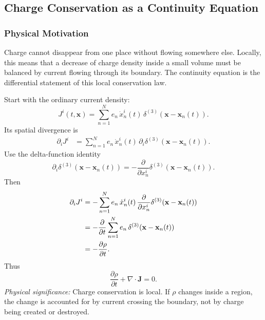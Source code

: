 \subsection{Charge Conservation as a Continuity Equation}\label{subsec:lec09-continuity}

\subsubsection*{Physical Motivation}
Charge cannot disappear from one place without flowing somewhere else.  Locally,
this means that a decrease of charge density inside a small volume must be
balanced by current flowing through its boundary.  The continuity equation is
the differential statement of this local conservation law.

Start with the ordinary current density:
\begin{equation}\label{eq:lec09-Ji-start}
  J^i(t,\mathbf{x})
  =
  \sum_{n=1}^N e_n\,\dot{x}_n^i(t)\,
  \delta^{(3)}\!\left(\mathbf{x}-\mathbf{x}_n(t)\right).
\end{equation}
Its spatial divergence is
\begin{align}
  \partial_i J^i
  &=
  \sum_{n=1}^N e_n\,\dot{x}_n^i(t)\,
  \partial_i
  \delta^{(3)}\!\left(\mathbf{x}-\mathbf{x}_n(t)\right).
  \label{eq:lec09-divJ-first}
\end{align}
Use the delta-function identity
\begin{equation}\label{eq:lec09-delta-identity}
  \partial_i
  \delta^{(3)}\!\left(\mathbf{x}-\mathbf{x}_n(t)\right)
  =
  -\frac{\partial}{\partial x_n^i}
  \delta^{(3)}\!\left(\mathbf{x}-\mathbf{x}_n(t)\right).
\end{equation}
Then
\begin{align}
  \partial_i J^i
  &=
  -\sum_{n=1}^N e_n\,\dot{x}_n^i(t)\,
  \frac{\partial}{\partial x_n^i}
  \delta^{(3)}\!\left(\mathbf{x}-\mathbf{x}_n(t)\right) \notag\\
  &=
  -\frac{\partial}{\partial t}
  \sum_{n=1}^N e_n\,
  \delta^{(3)}\!\left(\mathbf{x}-\mathbf{x}_n(t)\right) \notag\\
  &=
  -\frac{\partial \rho}{\partial t}.
  \label{eq:lec09-divJ-final}
\end{align}
Thus
\begin{equation}\label{eq:lec09-continuity-3d}
  \boxed{
  \frac{\partial \rho}{\partial t}+\nabla\cdot\mathbf{J}=0.
  }
\end{equation}
\textit{Physical significance:} Charge conservation is local.  If $\rho$ changes
inside a region, the change is accounted for by current crossing the boundary,
not by charge being created or destroyed.

